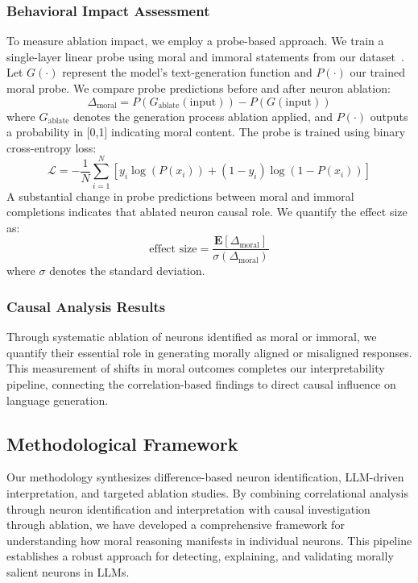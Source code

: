 \documentclass[runninghheads]{llncs}
\begin{document}
\subsubsection{Behavioral Impact Assessment}

To measure ablation impact, we employ a probe-based approach. We train a single-layer linear probe using moral and immoral statements from our dataset~\cite{Alain2018}. Let \(G(\cdot)\)  represent the model's text-generation function and \(P(\cdot)\) our trained moral probe. We compare probe predictions before and after neuron ablation:
$$
\Delta_{\text{moral}} = P(G_{\text{ablate}}(\text{input})) - P(G(\text{input}))
$$
where \(G_{\text{ablate}}\) denotes the generation process ablation applied, and \(P(\cdot)\) outputs a probability in [0,1] indicating moral content. The probe is trained using binary cross-entropy loss:
$$
\mathcal{L} = -\frac{1}{N}\sum_{i=1}^N [y_i \log(P(x_i)) + (1-y_i)\log(1-P(x_i))]
$$
A substantial change in probe predictions between moral and immoral completions indicates that ablated neuron causal role. 
We quantify the effect size as:
$$\text{effect size} = \frac{\mathbf{E}[\Delta_{\text{moral}}]}{\sigma(\Delta_{\text{moral}})}$$
where \(\sigma\) denotes the standard deviation.

\subsubsection{Causal Analysis Results}  
Through systematic ablation of neurons identified as moral or immoral, we quantify their essential role in generating morally aligned or misaligned responses. This measurement of shifts in moral outcomes completes our interpretability pipeline, connecting the correlation-based findings to direct causal influence on language generation.


\subsection{Methodological Framework}

Our methodology synthesizes difference-based neuron identification, LLM-driven interpretation, and targeted ablation studies. By combining correlational analysis through neuron identification and interpretation with causal investigation through ablation, we have developed a comprehensive framework for understanding how moral reasoning manifests in individual neurons. This pipeline establishes a robust approach for detecting, explaining, and validating morally salient neurons in LLMs.
\end{document}
